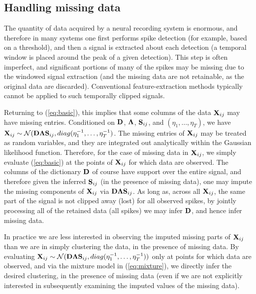\documentclass[journal]{IEEEtran}
\begin{document}
\subsection{Handling missing data} \label{sec:missing}

The quantity of data acquired by a neural recording system is enormous, and therefore in many systems one first performs spike detection (for example, based on a threshold), and then a signal is extracted about each detection (a temporal window is placed around the peak of a given detection). This step is often imperfect, and significant portions of many of the spikes may be missing due to the windowed signal extraction (and the missing data are not retainable, as the original data are discarded). Conventional feature-extraction methods typically cannot be applied to such temporally clipped signals.

Returning to (\ref{eq:basic}), this implies that some columns of the data ${\mathbf X}_{ij}$ may have missing entries. Conditioned on ${\mathbf D}$, $\boldsymbol{\Lambda}$, ${\mathbf S}_{ij}$, and $(\eta_1,\dots,\eta_T)$, we have ${\mathbf X}_{ij}\sim\mathcal{N}({\mathbf D}\boldsymbol{\Lambda}{\mathbf S}_{ij},\relax{diag}(\eta_1^{-1},\dots,\eta_T^{-1})$. The missing entries of ${\mathbf X}_{ij}$ may be treated as random variables, and they are integrated out analytically within the Gaussian likelihood function. Therefore, for the case of missing data in ${\mathbf X}_{ij}$, we simply evaluate (\ref{eq:basic}) at the points of ${\mathbf X}_{ij}$ for which data are observed. The columns of the dictionary ${\mathbf D}$ of course have support over the entire signal, and therefore given the inferred ${\mathbf S}_{ij}$ (in the presence of missing data), one may impute the missing components of ${\mathbf X}_{ij}$ via ${\mathbf D}\boldsymbol{\Lambda}{\mathbf S}_{ij}$. As long as, across all ${\mathbf X}_{ij}$, the same part of the signal is not clipped away (lost) for all observed spikes, by jointly processing all of the {retained} data (all spikes) we may infer ${\mathbf D}$, and hence infer missing data.

In practice we are less interested in observing the imputed missing parts of ${\mathbf X}_{ij}$ than we are in simply clustering the data, in the presence of missing data. By evaluating ${\mathbf X}_{ij}\sim\mathcal{N}({\mathbf D}\boldsymbol{\Lambda}{\mathbf S}_{ij},\relax{diag}(\eta_1^{-1},\dots,\eta_T^{-1}))$ only at points for which data are observed, and via the mixture model in (\ref{eq:mixture}), we directly infer the desired clustering, in the presence of missing data (even if we are not explicitly interested in subsequently examining the imputed values of the missing data).
\end{document}
